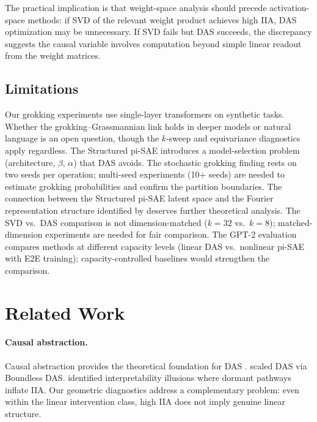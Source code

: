 \documentclass{article}
\begin{document}
The practical implication is that weight-space analysis should precede
activation-space methods: if SVD of the relevant weight product achieves
high IIA, DAS optimization may be unnecessary. If SVD fails but DAS
succeeds, the discrepancy suggests the causal variable involves
computation beyond simple linear readout from the weight matrices.

\subsection{Limitations}

Our grokking experiments use single-layer transformers on synthetic tasks.
Whether the grokking--Grassmannian link holds in deeper models or natural
language is an open question, though the $k$-sweep and equivariance
diagnostics apply regardless. The Structured pi-SAE introduces a model-selection
problem (architecture, $\beta$, $\alpha$) that DAS avoids. The stochastic
grokking finding rests on two seeds per operation; multi-seed experiments
(10+ seeds) are needed to estimate grokking probabilities and confirm the
partition boundaries. The connection between the Structured pi-SAE latent
space and the Fourier representation structure identified by
\citet{nanda2023progress} deserves further theoretical analysis. The SVD
vs.\ DAS comparison is not dimension-matched ($k = 32$ vs.\ $k = 8$);
matched-dimension experiments are needed for fair comparison. The GPT-2
evaluation compares methods at different capacity levels (linear DAS vs.\
nonlinear pi-SAE with E2E training); capacity-controlled baselines would
strengthen the comparison.


\section{Related Work}
\label{sec:related}

\paragraph{Causal abstraction.}
Causal abstraction provides the theoretical foundation for DAS
\citep{geiger2021causal, geiger2023finding}. \citet{wu2024interpretability}
scaled DAS via Boundless DAS. \citet{makelov2024illusion} identified
interpretability illusions where dormant pathways inflate IIA. Our geometric
diagnostics address a complementary problem: even within the linear intervention
class, high IIA does not imply genuine linear structure.
\end{document}
